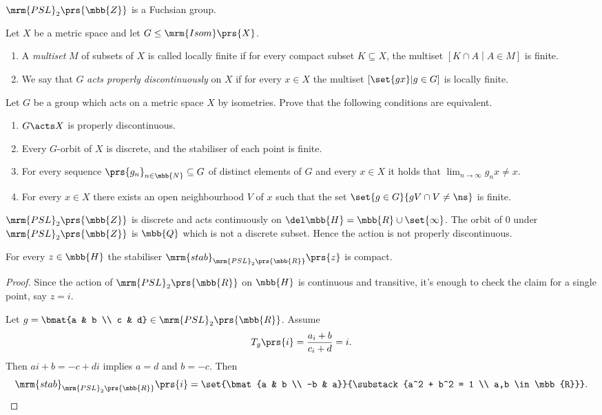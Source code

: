 \documentclass[10pt, twoside]{book}
\begin{document}
\begin{example}
$\mrm{PSL}_2\prs{\mbb{Z}}$ is a Fuchsian group.
\end{example}

\begin{definition}
Let $X$ be a metric space and let $G \leq \mrm{Isom}\prs{X}$.
\begin{enumerate}
\item A \emph{multiset} $M$ of subsets of $X$ is called locally finite if for every compact subset $K \subseteq X$, the multiset $\left[K \cap A \middle| A \in M\right]$ is finite.
\item We say that $G$ \emph{acts properly discontinuously} on $X$ if for every $x \in X$ the multiset $\left[ \set{gx} \middle| g \in G \right]$ is locally finite.
\end{enumerate}
\end{definition}

\begin{exercise}
Let $G$ be a group which acts on a metric space $X$ by isometries. Prove that the following conditions are equivalent.
\begin{enumerate}
\item%
$G \acts X$ is properly discontinuous.
\item%
Every $G$-orbit of $X$ is discrete, and the stabiliser of each point is finite.
\item For every sequence $\prs{g_n}_{n \in \mbb{N}} \subseteq G$ of distinct elements of $G$ and every $x \in X$ it holds that $\lim_{n\to\infty} g_n x \neq x$.
\item For every $x \in X$ there exists an open neighbourhood $V$ of $x$ such that the set $\set{g \in G}{gV \cap V \neq \ns}$ is finite.
\end{enumerate}
\end{exercise}

\begin{example}
$\mrm{PSL}_2\prs{\mbb{Z}}$ is discrete and acts continuously on $\del \mbb{H} = \mbb{R} \cup \set{\infty}$. The orbit of $0$ under $\mrm{PSL}_2\prs{\mbb{Z}}$ is $\mbb{Q}$ which is not a discrete subset. Hence the action is not properly discontinuous.
\end{example}

\begin{lemma}
For every $z \in \mbb{H}$ the stabiliser $\mrm{stab}_{\mrm{PSL}_2\prs{\mbb{R}}}\prs{z}$ is compact.
\end{lemma}

\begin{proof}
Since the action of $\mrm{PSL}_2\prs{\mbb{R}}$ on $\mbb{H}$ is continuous and transitive, it's enough to check the claim for a single point, say $z = i$.

Let $g = \bmat{a & b \\ c & d} \in \mrm{PSL}_2\prs{\mbb{R}}$. Assume
\[T_g\prs{i} = \frac{a_i + b}{c_i + d} = i \text{.}\]
Then
$ai + b = -c + di$ implies $a=d$ and $b=-c$. Then \[\mrm{stab}_{\mrm{PSL}_2\prs{\mbb{R}}}\prs{i} = \set{\bmat{a & b \\ -b & a}}{\substack{a^2 + b^2 = 1 \\ a,b \in \mbb{R}}} \text{.}\]
\end{proof}
\end{document}
